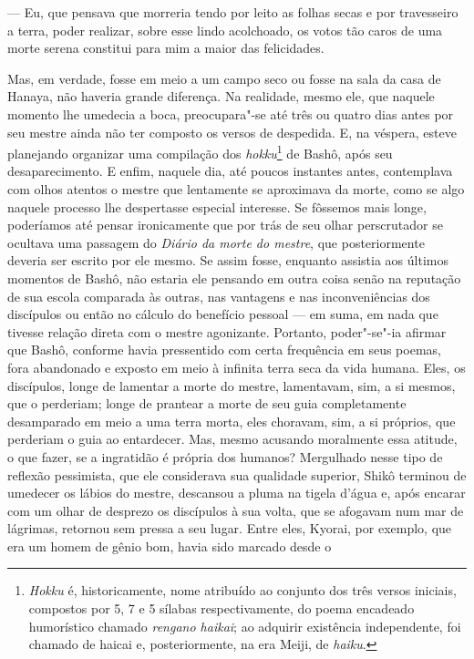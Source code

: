 --- Eu, que pensava que morreria tendo por leito as folhas secas e por
travesseiro a terra, poder realizar, sobre esse lindo acolchoado, os
votos tão caros de uma morte serena constitui para mim a maior das
felicidades.

Mas, em verdade, fosse em meio a um campo seco ou fosse na sala da casa
de Hanaya, não haveria grande diferença. Na realidade, mesmo ele, que
naquele momento lhe umedecia a boca, preocupara"-se até três ou quatro
dias antes por seu mestre ainda não ter composto os versos de
despedida. E, na véspera, esteve planejando organizar uma compilação
dos \textit{hokku}\footnote{ \textit{Hokku} é, historicamente, nome
atribuído ao conjunto dos três versos iniciais, compostos por 5, 7 e 5
sílabas respectivamente, do poema encadeado humorístico chamado
\textit{rengano haikai}; ao adquirir existência independente, foi
chamado de haicai e, posteriormente, na era Meiji, de \textit{haiku}.}
de Bashô, após seu desaparecimento. E enfim, naquele dia, até poucos
instantes antes, contemplava com olhos atentos o mestre que lentamente
se aproximava da morte, como se algo naquele processo lhe despertasse
especial interesse. Se fôssemos mais longe, poderíamos até pensar
ironicamente que por trás de seu olhar perscrutador se ocultava uma
passagem do \textit{Diário da morte do mestre}, que posteriormente
deveria ser escrito por ele mesmo. Se assim fosse, enquanto assistia
aos últimos momentos de Bashô, não estaria ele pensando em outra coisa
senão na reputação de sua escola comparada às outras, nas vantagens e
nas inconveniências dos discípulos ou então no cálculo do benefício
pessoal --- em suma, em nada que tivesse relação direta com o mestre
agonizante. Portanto, poder"-se"-ia afirmar que Bashô, conforme havia
pressentido com certa frequência em seus poemas, fora abandonado e
exposto em meio à infinita terra seca da vida humana. Eles, os
discípulos, longe de lamentar a morte do mestre, lamentavam, sim, a si
mesmos, que o perderiam; longe de prantear a morte de seu guia
completamente desamparado em meio a uma terra morta, eles choravam,
sim, a si próprios, que perderiam o guia ao entardecer. Mas, mesmo
acusando moralmente essa atitude, o que fazer, se a ingratidão é
própria dos humanos? Mergulhado nesse tipo de reflexão pessimista, que
ele considerava sua qualidade superior, Shikô terminou de umedecer
os lábios do mestre, descansou a pluma na tigela d'água e, após encarar
com um olhar de desprezo os discípulos à sua volta, que se afogavam num
mar de lágrimas, retornou sem pressa a seu lugar. Entre eles, Kyorai,
por exemplo, que era um homem de gênio bom, havia sido marcado desde o
